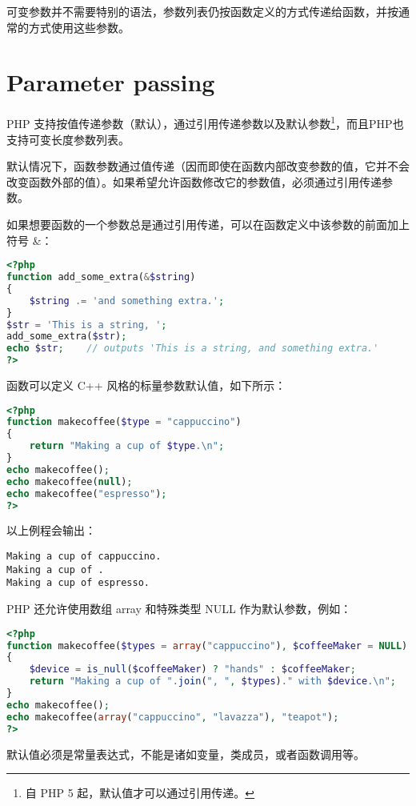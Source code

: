 可变参数并不需要特别的语法，参数列表仍按函数定义的方式传递给函数，并按通常的方式使用这些参数。

\section{Parameter passing}



PHP 支持按值传递参数（默认），通过引用传递参数以及默认参数\footnote{自 PHP 5 起，默认值才可以通过引用传递。}，而且PHP也支持可变长度参数列表。


默认情况下，函数参数通过值传递（因而即使在函数内部改变参数的值，它并不会改变函数外部的值）。如果希望允许函数修改它的参数值，必须通过引用传递参数。

如果想要函数的一个参数总是通过引用传递，可以在函数定义中该参数的前面加上符号 \&：

\begin{lstlisting}[language=PHP]
<?php
function add_some_extra(&$string)
{
    $string .= 'and something extra.';
}
$str = 'This is a string, ';
add_some_extra($str);
echo $str;    // outputs 'This is a string, and something extra.'
?>
\end{lstlisting}


函数可以定义 C++ 风格的标量参数默认值，如下所示：

\begin{lstlisting}[language=PHP]
<?php
function makecoffee($type = "cappuccino")
{
    return "Making a cup of $type.\n";
}
echo makecoffee();
echo makecoffee(null);
echo makecoffee("espresso");
?>
\end{lstlisting}

以上例程会输出：

\begin{verbatim}
Making a cup of cappuccino.
Making a cup of .
Making a cup of espresso.
\end{verbatim}

PHP 还允许使用数组 array 和特殊类型 NULL 作为默认参数，例如：

\begin{lstlisting}[language=PHP]
<?php
function makecoffee($types = array("cappuccino"), $coffeeMaker = NULL)
{
    $device = is_null($coffeeMaker) ? "hands" : $coffeeMaker;
    return "Making a cup of ".join(", ", $types)." with $device.\n";
}
echo makecoffee();
echo makecoffee(array("cappuccino", "lavazza"), "teapot");
?>
\end{lstlisting}


默认值必须是常量表达式，不能是诸如变量，类成员，或者函数调用等。

